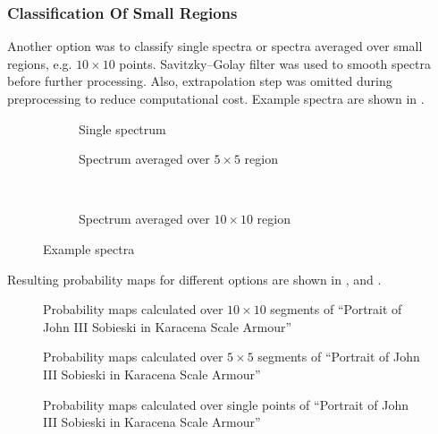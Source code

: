 \subsubsection{Classification Of Small Regions}
Another option was to classify single spectra or spectra averaged over small regions, e.g. $10\times10$ points. 
Savitzky–Golay filter was used to smooth spectra before further processing.
Also, extrapolation step was omitted during preprocessing to reduce computational cost.
Example spectra are shown in .

\begin{figure}[H]
    \begin{subfigure}{.5\linewidth}
        \centering
        
        \caption{Single spectrum }
        \label{fig:sub1}
    \end{subfigure}%
    \begin{subfigure}{.5\linewidth}
        \centering
        
        \caption{Spectrum averaged over $5\times5$ region}
        \label{fig:sub2}
    \end{subfigure}\\[1ex]
    \centering
    \begin{subfigure}{0.5\linewidth}
        \centering
        
        \caption{Spectrum averaged over $10\times10$ region}
        \label{fig:sub3}
    \end{subfigure}
    \caption{Example spectra}
    \label{fig:spectra}
\end{figure}

Resulting probability maps for different options are shown in ,  and .

\begin{figure}[htbp!]
  \centering
  
  \caption{Probability maps calculated over $10\times10$ segments of ``Portrait of John III Sobieski in Karacena Scale Armour''}
  \label{fig:10x10-point-sobieski}
\end{figure}

\begin{figure}[htbp!]
  \centering
  
  \caption{Probability maps calculated over $5\times5$ segments of ``Portrait of John III Sobieski in Karacena Scale Armour''}
  \label{fig:5x5-point-sobieski}
\end{figure}

\begin{figure}[htbp!]
  \centering
  
  \caption{Probability maps calculated over single points of ``Portrait of John III Sobieski in Karacena Scale Armour''}
  \label{fig:single-point-sobieski}
\end{figure}